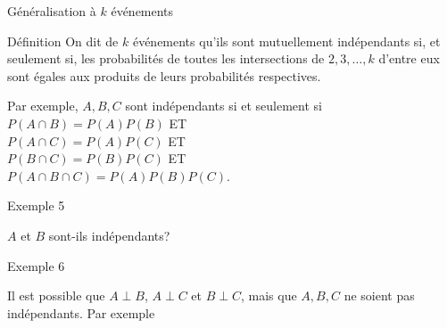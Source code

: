 \documentclass{BeamerTemplate}
\begin{document}
\begin{frame}[t]{Généralisation à $k$ événements}
 \begin{Boite}{Définition}
  On dit de $k$ événements qu'ils sont \alert{mutuellement
  indépendants} si, et seulement si, les probabilités de
  \alert{toutes} les intersections de $2,3,\ldots,k$ d'entre
  eux sont égales aux produits de leurs probabilités
  respectives.
 \end{Boite}

 \medskip
 Par exemple, $A,B,C$ sont indépendants si et seulement si \\
 $P(A\cap B)=P(A)P(B)$ ET \\
 $P(A\cap C)=P(A)P(C)$ ET \\
 $P(B\cap C)=P(B)P(C)$ ET \\
 $P(A\cap B\cap C)=P(A)P(B)P(C)$.
\end{frame}

\begin{frame}[t]{Exemple 5}

$A$ et $B$ sont-ils indépendants?

\begin{center}
\end{center}

\end{frame}

\begin{frame}[t]{Exemple 6}

Il est possible que $A\perp B$, $A\perp C$ et $B\perp C$, mais
que $A,B,C$ ne
soient pas indépendants. Par exemple

\begin{center}
\end{center}

\end{frame}
\end{document}

